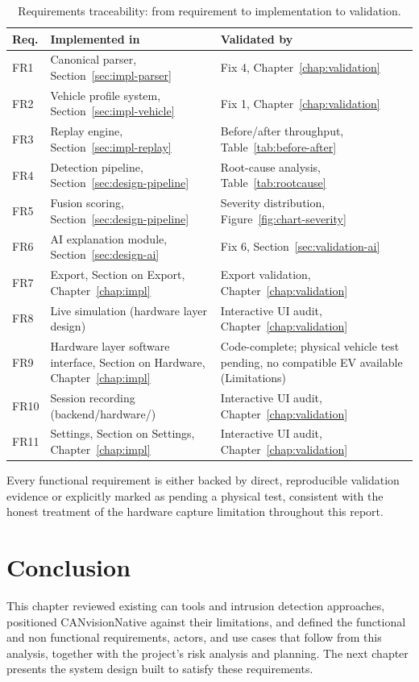 \begin{table}[H]
\centering
\caption{Requirements traceability: from requirement to implementation to validation.}
\label{tab:traceability}
\begin{tabularx}{\textwidth}{|p{1.3cm}|X|p{3.4cm}|}
\hline
\textbf{Req.} & \textbf{Implemented in} & \textbf{Validated by} \\
\hline
FR1 & Canonical parser, Section~\ref{sec:impl-parser} & Fix 4, Chapter~\ref{chap:validation} \\
\hline
FR2 & Vehicle profile system, Section~\ref{sec:impl-vehicle} & Fix 1, Chapter~\ref{chap:validation} \\
\hline
FR3 & Replay engine, Section~\ref{sec:impl-replay} & Before/after throughput, Table~\ref{tab:before-after} \\
\hline
FR4 & Detection pipeline, Section~\ref{sec:design-pipeline} & Root-cause analysis, Table~\ref{tab:rootcause} \\
\hline
FR5 & Fusion scoring, Section~\ref{sec:design-pipeline} & Severity distribution, Figure~\ref{fig:chart-severity} \\
\hline
FR6 & AI explanation module, Section~\ref{sec:design-ai} & Fix 6, Section~\ref{sec:validation-ai} \\
\hline
FR7 & Export, Section on Export, Chapter~\ref{chap:impl} & Export validation, Chapter~\ref{chap:validation} \\
\hline
FR8 & Live simulation (hardware layer design) & Interactive UI audit, Chapter~\ref{chap:validation} \\
\hline
FR9 & Hardware layer software interface, Section on Hardware, Chapter~\ref{chap:impl} & Code-complete; physical vehicle test pending, no compatible EV available (Limitations) \\
\hline
FR10 & Session recording (backend/hardware/) & Interactive UI audit, Chapter~\ref{chap:validation} \\
\hline
FR11 & Settings, Section on Settings, Chapter~\ref{chap:impl} & Interactive UI audit, Chapter~\ref{chap:validation} \\
\hline
\end{tabularx}
\end{table}

Every functional requirement is either backed by direct, reproducible validation evidence or explicitly marked as pending a physical test, consistent with the honest treatment of the hardware capture limitation throughout this report.

\section{Conclusion}

This chapter reviewed existing \gls{can} tools and intrusion detection approaches, positioned CANvisionNative against their limitations, and defined the functional and non functional requirements, actors, and use cases that follow from this analysis, together with the project's risk analysis and planning. The next chapter presents the system design built to satisfy these requirements.
